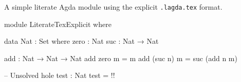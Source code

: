 \documentclass{article}
\begin{document}
A simple literate Agda module using the explicit \texttt{.lagda.tex} format.

\begin{code}
module LiterateTexExplicit where

data Nat : Set where
  zero : Nat
  suc  : Nat → Nat

add : Nat → Nat → Nat
add zero    m = m
add (suc n) m = suc (add n m)

-- Unsolved hole
test : Nat
test = {!!}
\end{code}
\end{document}
